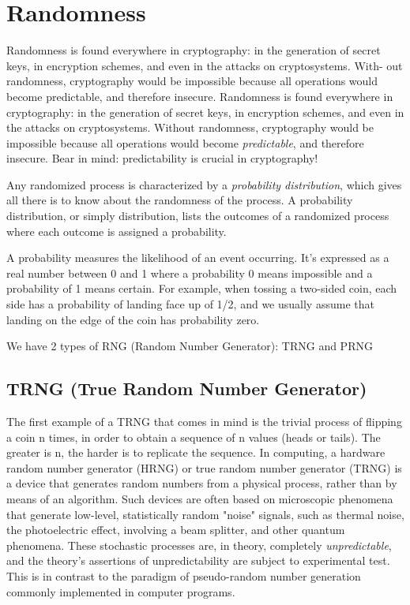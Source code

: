 \documentclass{article}
\begin{document}
\section{Randomness}
Randomness is found everywhere in cryptography: in the generation of secret
keys, in encryption schemes, and even in the attacks on cryptosystems. With-
out randomness, cryptography would be impossible because all operations would
become predictable, and therefore insecure.
Randomness is found everywhere in cryptography: in the generation of secret keys, in encryption schemes, and even in the attacks on cryptosystems. Without randomness, cryptography would be impossible because all operations would become \textit{predictable}, and therefore insecure. Bear in mind: predictability is crucial in cryptography!
 
Any randomized process is characterized by a \textit{probability distribution},
which gives all there is to know about the randomness of the process. A
probability distribution, or simply distribution, lists the outcomes of a
randomized process where each outcome is assigned a probability.

A probability measures the likelihood of an event occurring. It’s
expressed as a real number between 0 and 1 where a probability 0 means
impossible and a probability of 1 means certain. For example, when
tossing a two-sided coin, each side has a probability of landing face up of
1/2, and we usually assume that landing on the edge of the coin has
probability zero.

We have 2 types of RNG (Random Number Generator): TRNG and PRNG
\subsection{TRNG (True Random Number Generator)}
The first example of a TRNG that comes in mind is the trivial process of flipping a coin n times, in order to obtain a sequence of n values (heads or tails). The greater is n, the harder is to replicate the sequence.
In computing, a hardware random number generator (HRNG) or true random number generator (TRNG) is a device that generates random numbers from a physical process, rather than by means of an algorithm. Such devices are often based on microscopic phenomena that generate low-level, statistically random "noise" signals, such as thermal noise, the photoelectric effect, involving a beam splitter, and other quantum phenomena. These stochastic processes are, in theory, completely \textit{unpredictable}, and the theory's assertions of unpredictability are subject to experimental test. This is in contrast to the paradigm of pseudo-random number generation commonly implemented in computer programs.
\end{document}
